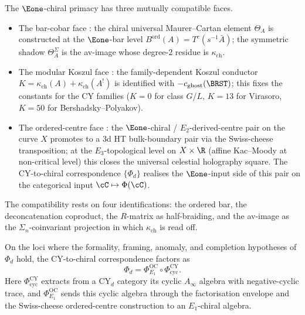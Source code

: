 \begin{remark}
\label{rem:e1-cross-volume-anchors}
The $\Eone$-chiral primacy has three mutually compatible faces.
\begin{itemize}
 \item The bar-cobar face \cite{VolI}: the chiral
 universal Maurer--Cartan element $\Theta_A$ is constructed at the
 $\Eone$-bar level $B^{\mathrm{ord}}(A) = T^c(s^{-1}\bar A)$;
 the symmetric shadow $\Theta_A^\Sigma$ is the av-image whose
 degree-$2$ residue is $\kappa_{\mathrm{ch}}$.
 \item The modular Koszul face \cite{VolI}:
 the family-dependent Koszul conductor
 $K = \kappa_{\mathrm{ch}}(A) + \kappa_{\mathrm{ch}}(A^!)$ is identified
 with $-c_{\mathrm{ghost}}(\BRST)$; this fixes the constants for
 the CY families \textup{(}$K = 0$ for class $G$/$L$,
 $K = 13$ for Virasoro, $K = 50$ for Bershadsky--Polyakov\textup{)}.
 \item The ordered-centre face \textup{\cite{VolII}}:
 the $\Eone$-chiral / $E_2$-derived-centre pair on the curve $X$
 promotes to a 3d HT bulk-boundary pair via the Swiss-cheese
 transposition; at the $E_3$-topological level on $X \times \R$
 \textup{(}affine Kac--Moody at non-critical level\textup{)} this
 closes the universal celestial holography square. The
 CY-to-chiral correspondence $\{\Phi_d\}$ realises the $\Eone$-input side of
 this pair on the categorical input
 $\cC \mapsto \Phi(\cC)$.
\end{itemize}
The compatibility rests on four identifications: the ordered bar,
the deconcatenation coproduct, the $R$-matrix as half-braiding, and the
av-image as the $\Sigma_n$-coinvariant projection in which
$\kappa_{\mathrm{ch}}$ is read off.
\end{remark}

\begin{proposition}
\label{prop:vol3-composes-vol2}
On the loci where the formality, framing, anomaly, and completion hypotheses of $\Phi_d$ hold, the CY-to-chiral correspondence factors as
\[
 \Phi_d =
 \Phi^{\mathrm{OC}}_{E_1} \circ \Phi^{\mathrm{CY}}_{\mathrm{cyc}} .
\]
Here $\Phi^{\mathrm{CY}}_{\mathrm{cyc}}$ extracts from a CY$_d$ category its cyclic $A_\infty$ algebra with negative-cyclic trace, and $\Phi^{\mathrm{OC}}_{E_1}$ sends this cyclic algebra through the factorisation envelope and the Swiss-cheese ordered-centre construction to an $E_1$-chiral algebra.
\end{proposition}

